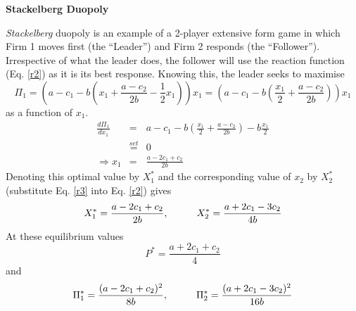 \documentclass[12pt]{article}
\begin{document}
 \begin{center}
\textbf{Stackelberg Duopoly %
}
\end{center}
\textit{Stackelberg} duopoly is an example of a 2-player extensive form game in which Firm 1 moves first (the ``Leader'') and Firm 2 responds (the ``Follower''). Irrespective of what the leader does, the follower will use the reaction function (Eq. \ref{r2}) as it is its best response.
\newpage
Knowing this, the leader seeks to maximise $$ \Pi_1 = \left(a-c_1 - b\left(x_1 + \frac{a-c_2}{2b} - \frac{1}{2} x_1\right)\right) x_1 = \left(a-c_1 - b\left(\frac{x_1}{2} + \frac{a-c_2}{2b} \right)\right) x_1$$
as a function of $x_1$.
\begin{eqnarray}
 \frac{d \Pi_1} {d x_1} &=& a-c_1 - b\left(\frac{x_1}{2}+ \frac{a-c_2}{2b}\right) - b\frac{x_1}{2} \nonumber \\
 & \stackrel{set}{=} & 0 \nonumber \\
 \Rightarrow x_1 &=& \frac{a-2c_1 + c_2}{2b} \label{r3}
 \end{eqnarray}
 Denoting this optimal value by $X_1^*$ and the corresponding value of $x_2$ by $X_2^*$ (substitute Eq. \ref{r3} into Eq. \ref{r2}) gives
$$ X_1^* = \frac{a-2c_1 + c_2}{2b}, \hspace{10mm} X_2^* = \frac{a+2c_1-3c_2}{4b} $$
At these equilibrium values
$$ P^* = \frac{a+2c_1+c_2}{4} $$
 and
 \begin{equation} \Pi_1^* = \frac{(a-2c_1+ c_2)^2}{8b}, \hspace{10mm} \Pi_2^* = \frac{(a+2c_1- 3c_2)^2}{16b}\label{sp} \end{equation}
\end{document}
